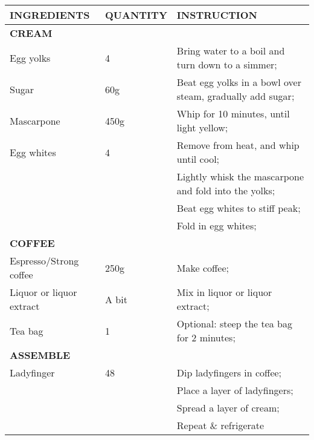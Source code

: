 \documentclass{article}
\newcommand{\tabletitle}[1]{\midrule\multicolumn{3}{l}{\textbf{\color{BrickRed} \MakeUppercase{#1}}}}
\begin{document}
\begin{tabular}{lll} 
  \toprule
  \textbf{\MakeUppercase{Ingredients}}     & \textbf{\MakeUppercase{Quantity}} & \textbf{\MakeUppercase{Instruction}}                                      \\
  \tabletitle{Cream}                                                                                       \\
  Egg yolks                & 4                 & Bring water to a boil and turn down to a simmer;          \\
  Sugar                    & 60g               & Beat egg yolks in a bowl over steam, gradually add sugar; \\
  Mascarpone               & 450g              & Whip for 10 minutes, until light yellow;                  \\
  Egg whites               & 4                 & Remove from heat, and whip until cool;                    \\
                           &                   & Lightly whisk the mascarpone and fold into the yolks;     \\
                           &                   & Beat egg whites to stiff peak;                            \\
                           &                   & Fold in egg whites;                                       \\
  \tabletitle{Coffee}                                                                                      \\
  Espresso/Strong coffee   & 250g              & Make coffee;                                              \\
  Liquor or liquor extract & A bit             & Mix in liquor or liquor extract;                          \\
  Tea bag                  & 1                 & Optional: steep the tea bag for 2 minutes;                \\
  \tabletitle{Assemble}                                                                                    \\
  Ladyfinger               & 48                & Dip ladyfingers in coffee;                                \\
                           &                   & Place a layer of ladyfingers;                             \\
                           &                   & Spread a layer of cream;                                  \\
                           &                   & Repeat \& refrigerate                                     \\
  \bottomrule
\end{tabular}
\end{document}
